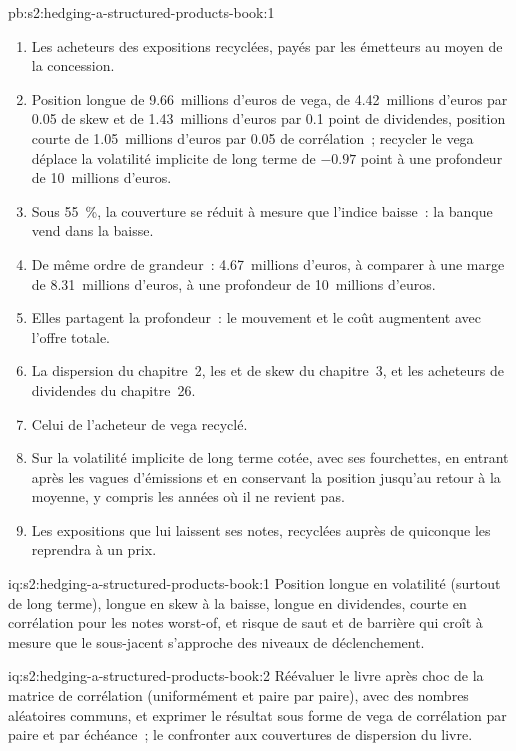 \begin{solution}{pb:s2:hedging-a-structured-products-book:1}
\begin{enumerate}
\item Les acheteurs des expositions recyclées, payés par les émetteurs au moyen de la concession.
\item Position longue de 9.66~millions d'euros de vega, de 4.42~millions d'euros par 0.05 de skew et de 1.43~millions d'euros par 0.1 point de dividendes, position courte de 1.05~millions d'euros par 0.05 de
corrélation~; recycler le vega déplace la volatilité implicite de long terme de $-0.97$ point à une profondeur de 10~millions d'euros.
\item Sous 55~\%, la couverture se réduit à mesure que l'indice baisse~: la banque vend dans la baisse.
\item De même ordre de grandeur~: 4.67~millions d'euros, à comparer à une marge de 8.31~millions d'euros, à une profondeur de 10~millions d'euros.
\item Elles partagent la profondeur~: le mouvement et le coût augmentent avec l'offre totale.
\item La dispersion du chapitre~2, les  et de skew du chapitre~3, et les acheteurs de dividendes du chapitre~26.
\item Celui de l'acheteur de vega recyclé.
\item Sur la volatilité implicite de long terme cotée, avec ses fourchettes, en entrant après les vagues d'émissions et en conservant la position jusqu'au retour à la moyenne, y compris les années où il ne
revient pas.
\item Les expositions que lui laissent ses notes, recyclées auprès de quiconque les reprendra à un prix.
\end{enumerate}
\end{solution}

\begin{solution}{iq:s2:hedging-a-structured-products-book:1}
Position longue en volatilité (surtout de long terme), longue en skew à la baisse, longue en dividendes, courte en corrélation pour les notes worst-of, et risque de saut et de barrière qui croît à mesure que
le sous-jacent s'approche des niveaux de déclenchement.
\end{solution}

\begin{solution}{iq:s2:hedging-a-structured-products-book:2}
Réévaluer le livre après choc de la matrice de corrélation (uniformément et paire par paire), avec des nombres aléatoires communs, et exprimer le résultat sous forme de
vega de corrélation par paire et par échéance~; le confronter aux couvertures de dispersion du livre.
\end{solution}

